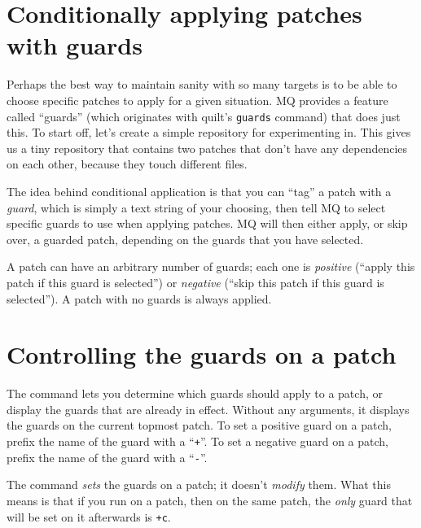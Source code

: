 \section{Conditionally applying patches with 
  guards}

Perhaps the best way to maintain sanity with so many targets is to be
able to choose specific patches to apply for a given situation.  MQ
provides a feature called ``guards'' (which originates with quilt's
\texttt{guards} command) that does just this.  To start off, let's
create a simple repository for experimenting in.
This gives us a tiny repository that contains two patches that don't
have any dependencies on each other, because they touch different files.

The idea behind conditional application is that you can ``tag'' a
patch with a \emph{guard}, which is simply a text string of your
choosing, then tell MQ to select specific guards to use when applying
patches.  MQ will then either apply, or skip over, a guarded patch,
depending on the guards that you have selected.

A patch can have an arbitrary number of guards;
each one is \emph{positive} (``apply this patch if this guard is
selected'') or \emph{negative} (``skip this patch if this guard is
selected'').  A patch with no guards is always applied.

\section{Controlling the guards on a patch}

The  command lets you determine which guards should
apply to a patch, or display the guards that are already in effect.
Without any arguments, it displays the guards on the current topmost
patch.
To set a positive guard on a patch, prefix the name of the guard with
a ``\texttt{+}''.
To set a negative guard on a patch, prefix the name of the guard with
a ``\texttt{-}''.

\begin{note}
  The  command \emph{sets} the guards on a patch; it
  doesn't \emph{modify} them.  What this means is that if you run
   on a patch, then  on
  the same patch, the \emph{only} guard that will be set on it
  afterwards is \texttt{+c}.
\end{note}


